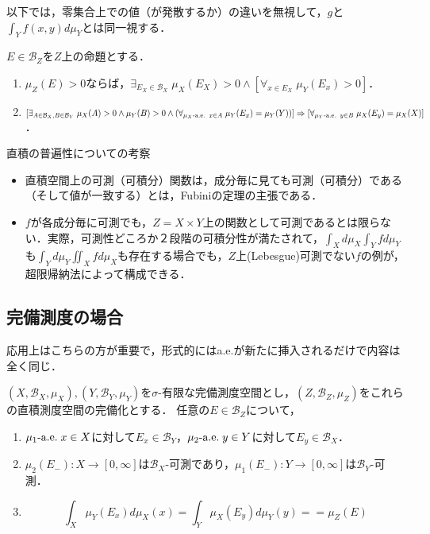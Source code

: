\documentclass[uplatex, dvipdfmx]{jsreport}
\renewcommand{\B}{\mathcal{B}}
\begin{document}
\begin{remark}[Fubiniの定理の暗黙の前提]
    以下では，零集合上での値（が発散するか）の違いを無視して，$g$と$\int_Yf(x,y)d\mu_Y$とは同一視する．
\end{remark}

\begin{corollary}[Fubiniの定理の論理的解釈]
    $E\in\B_Z$を$Z$上の命題とする．
    \begin{enumerate}
        \item $\mu_Z(E)>0$ならば，$\exists_{E_X\in\B_X}\;\mu_X(E_X)>0\land[\forall_{x\in E_X}\;\mu_Y(E_x)>0]$．
        \item $[\exists_{A\in\B_X,B\in\B_Y}\;\mu_X(A)>0\land\mu_Y(B)>0\land(\forall_{\mu_X\Ae\; x\in A}\;\mu_Y(E_x)=\mu_Y(Y))]\Rightarrow [\forall_{\mu_Y\Ae\; y\in B}\;\mu_X(E_y)=\mu_X(X)]$．
    \end{enumerate}
\end{corollary}

\begin{itembox}[l]{直積の普遍性についての考察}
    \begin{itemize}
        \item 直積空間上の可測（可積分）関数は，成分毎に見ても可測（可積分）である（そして値が一致する）とは，Fubiniの定理の主張である．
        \item $f$が各成分毎に可測でも，$Z=X\times Y$上の関数として可測であるとは限らない．実際，可測性どころか２段階の可積分性が満たされて，$\int_Xd\mu_X\int_Yfd\mu_Y$も$\int_Yd\mu_Y\iint_Xfd\mu_X$も存在する場合でも，$Z$上(Lebesgue)可測でない$f$の例が，超限帰納法によって構成できる．
    \end{itemize}
\end{itembox}

\subsection{完備測度の場合}

\begin{tcolorbox}[colframe=ForestGreen, colback=ForestGreen!10!white,breakable,colbacktitle=ForestGreen!40!white,coltitle=black,fonttitle=\bfseries\sffamily,
title=]
    応用上はこちらの方が重要で，形式的にはa.e.が新たに挿入されるだけで内容は全く同じ．
\end{tcolorbox}

\begin{theorem}
    $(X,\B_X,\mu_X),(Y,\B_Y,\mu_Y)$を$\sigma$-有限な完備測度空間とし，$(Z,\B_Z,\mu_Z)$をこれらの直積測度空間の完備化とする．
    任意の$E\in\B_Z$について，
    \begin{enumerate}
        \item $\mu_1\textrm{-a.e.}\; x\in X$に対して$E_x\in\B_Y$，$\mu_2\textrm{-a.e.}\; y\in Y$に対して$E_y\in\B_X$．
        \item $\mu_2(E_-):X\to[0,\infty]$は$\B_X$-可測であり，$\mu_1(E_-):Y\to[0,\infty]$は$\B_Y$-可測．
        \item \[\int_X\mu_Y(E_x)d\mu_X(x)=\int_Y\mu_X(E_y)d\mu_Y(y)==\mu_Z(E)\]
    \end{enumerate}
\end{theorem}
\end{document}
